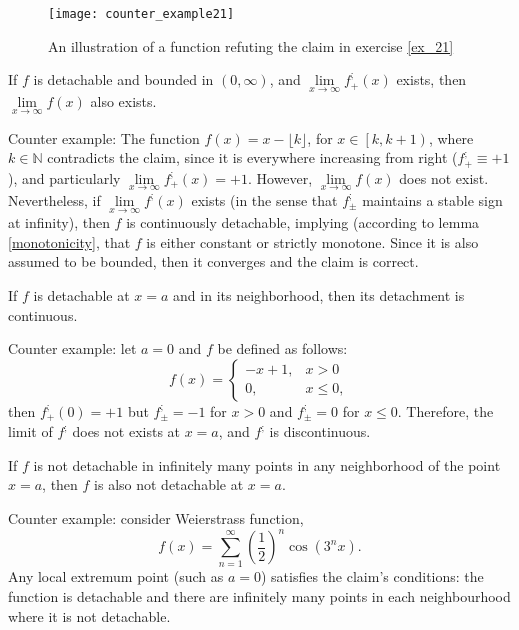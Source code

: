 \documentclass[11pt]{book}
\begin{document}
\begin{figure}[h!]
\texttt{[image: counter\_example21]}
\label{counter_example21}
\caption{An illustration of a function refuting the claim in exercise \ref{ex_21}}
\end{figure}

\begin{exercise}If $f$ is detachable and bounded in $\left(0,\infty\right)$,
and $\underset{x\rightarrow\infty}{\lim}f_{+}^{;}\left(x\right)$
exists, then $\underset{x\rightarrow\infty}{\lim}f\left(x\right)$
also exists.
\end{exercise}

Counter example: The function $f\left(x\right)=x-\lfloor k\rfloor$,
for $x\in\left[k,k+1\right)$, where $k\in\mathbb{N}$ contradicts
the claim, since it is everywhere increasing from right ($f_{+}^{;}\equiv+1$),
and particularly $\underset{x\rightarrow\infty}{\lim}f_{+}^{;}\left(x\right)=+1$.
However, $\underset{x\rightarrow\infty}{\lim}f\left(x\right)$ does
not exist. Nevertheless, if $\underset{x\rightarrow\infty}{\lim}f^{;}\left(x\right)$
exists (in the sense that $f_{\pm}^{;}$ maintains a stable sign at
infinity), then $f$ is continuously detachable, implying (according
to lemma \ref{monotonicity}, that $f$ is either constant
or strictly monotone. Since it is also assumed to be bounded, then
it converges and the claim is correct.

\begin{exercise}If $f$ is detachable at $x=a$ and in its neighborhood, then
its detachment is continuous.
\end{exercise}

Counter example: let $a=0$ and $f$ be defined as follows:
\[
f\left(x\right)=\begin{cases}
-x+1, & x>0\\
0, & x\leq0,
\end{cases}
\]
then $f_{+}^{;}\left(0\right)=+1$ but $f_{\pm}^{;}=-1$ for $x>0$
and $f_{\pm}^{;}=0$ for $x\leq0$. Therefore, the limit of $f^{;}$
does not exists at $x=a$, and $f^{;}$ is discontinuous.

\begin{exercise}If $f$ is not detachable in infinitely many points in any neighborhood
of the point $x=a$, then $f$ is also not detachable at $x=a$.
\end{exercise}

Counter example: consider Weierstrass function, \[ f\left(x\right)=\sum_{n=1}^{\infty}\left(\frac{1}{2}\right)^{n}\cos\left(3^{n}x\right).\]
Any local extremum point (such as $a=0$) satisfies the claim's conditions:
the function is detachable and there are infinitely many
points in each neighbourhood where it is not detachable.
\end{document}
